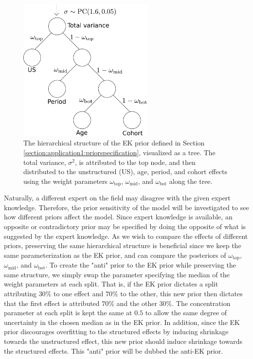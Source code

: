 \begin{figure}[h!]
    \centering
    \includegraphics[width=0.6\textwidth]{Figures/Tree_some_annot.pdf}
    \caption{The hierarchical structure of the EK prior defined in Section \ref{section:application1:priorspecification}, visualized as a tree. The total variance, $\sigma^2$, is attributed to the top node, and then distributed to the unstructured (US), age, period, and cohort effects using the weight parameters $\omega_{\text{top}}$, $\omega_{\text{mid}}$, and $\omega_{\text{bot}}$ along the tree.}
    \label{figure:EK-tree}
\end{figure}

Naturally, a different expert on the field may disagree with the given expert knowledge. Therefore, the prior sensitivity of the model will be investigated to see how different priors affect the model. Since expert knowledge is available, an opposite or contradictory prior may be specified by doing the opposite of what is suggested by the expert knowledge. As we wish to compare the effects of different priors, preserving the same hierarchical structure is beneficial since we keep the same parameterization as the EK prior, and can compare the posteriors of $\omega_{\text{top}}$, $\omega_{\text{mid}}$, and $\omega_{\text{bot}}$. To create the "anti" prior to the EK prior while preserving the same structure, we simply swap the parameter specifying the median of the weight parameters at each split. That is, if the EK prior dictates a split attributing $30\%$ to one effect and $70\%$ to the other, this new prior then dictates that the first effect is attributed $70\%$ and the other $30\%$. The concentration parameter at each split is kept the same at $0.5$ to allow the same degree of uncertainty in the chosen median as in the EK prior. In addition, since the EK prior discourages overfitting to the structured effects by inducing shrinkage towards the unstructured effect, this new prior should induce shrinkage towards the structured effects. This "anti" prior will be dubbed the anti-EK prior.

